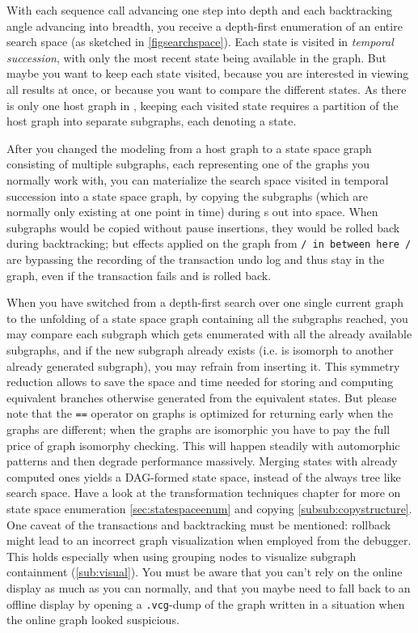 With each sequence call advancing one step into depth and each backtracking angle advancing into breadth, you receive a depth-first enumeration of an entire search space (as sketched in \ref{figsearchspace}).
Each state is visited in \emph{temporal succession}, with only the most recent state being available in the graph.
But maybe you want to keep each state visited, because you are interested in viewing all results at once, or because you want to compare the different states.
As there is only one host graph in \GrG, keeping each visited state requires a partition of the host graph into separate subgraphs, each denoting a state.

After you changed the modeling from a host graph to a state space graph consisting of multiple subgraphs, each representing one of the graphs you normally work with, 
you can materialize the search space visited in temporal succession into a state space graph,
by copying the subgraphs (which are normally only existing at one point in time) during s out into space.
When subgraphs would be copied without pause insertions, they would be rolled back during backtracking; but effects applied on the graph from \texttt{/ in between here /} are bypassing the recording of the transaction undo log and thus stay in the graph, even if the transaction fails and is rolled back. 

When you have switched from a depth-first search over one single current graph to the unfolding of a state space graph containing all the subgraphs reached, you may compare each subgraph which gets enumerated with all the already available subgraphs, and if the new subgraph already exists (i.e. is isomorph to another already generated subgraph), you may refrain from inserting it.
This symmetry reduction allows to save the space and time needed for storing and computing equivalent branches otherwise generated from the equivalent states. 
But please note that the \texttt{==} operator on graphs is optimized for returning early when the graphs are different; when the graphs are isomorphic you have to pay the full price of graph isomorphy checking.
This will happen steadily with automorphic patterns and then degrade performance massively.
Merging states with already computed ones yields a DAG-formed state space, instead of the always tree like search space.
Have a look at the transformation techniques chapter for more on state space enumeration \ref{sec:statespaceenum} and copying \ref{subsub:copystructure}.
One caveat of the transactions and backtracking must be mentioned: rollback might lead to an incorrect graph visualization when employed from the debugger.
This holds especially when using grouping nodes to visualize subgraph containment (\ref{sub:visual}). You must be aware that you can't rely on the online display as much as you can normally, and that you maybe need to fall back to an offline display by opening a \texttt{.vcg}-dump of the graph written in a situation when the online graph looked suspicious. 

